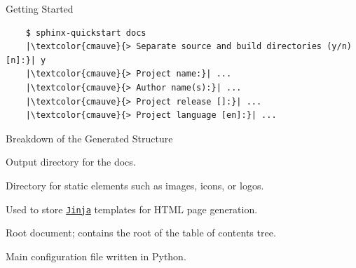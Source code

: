\begin{frame}[fragile]{Getting Started}
  \begin{verbatim}
    $ sphinx-quickstart docs
    |\textcolor{cmauve}{> Separate source and build directories (y/n) [n]:}| y
    |\textcolor{cmauve}{> Project name:}| ...
    |\textcolor{cmauve}{> Author name(s):}| ...
    |\textcolor{cmauve}{> Project release []:}| ...
    |\textcolor{cmauve}{> Project language [en]:}| ...
  \end{verbatim}

  \begin{center}
  \pause
  \begin{minipage}{.45\textwidth}
  \end{minipage}
  \hfill
  \pause
  \begin{minipage}{.45\textwidth}
  \end{minipage}
  \end{center}
\end{frame}
{
\begin{frame}[fragile]{Breakdown of the Generated Structure}
  \begin{description}[labelwidth=\widthof{\faFolderOpen \texttt{\_templates}}]
    \setlength{\itemindent}{-4em}
    \item [\textcolor{dircolor}{\faFolderOpen} \texttt{build}:] Output directory for the docs.
    \item [\textcolor{dircolor}{\faFolderOpen} \texttt{\_static}:] Directory for static elements such as images, icons, or logos.
    \item [\textcolor{dircolor}{\faFolderOpen} \texttt{\_templates}:] Used to store \href{https://jinja.palletsprojects.com/en/stable/}{\texttt{Jinja}}
      templates for HTML page generation. %
    \item [\textcolor{vertexDarkRed}{\faFile*} \texttt{index.rst}:] Root document; contains the root of the table of contents tree.
    \item [\textcolor{vertexDarkRed}{\faPython} \texttt{conf.py}:] Main configuration file written in Python.
  \end{description}
\end{frame}
}

